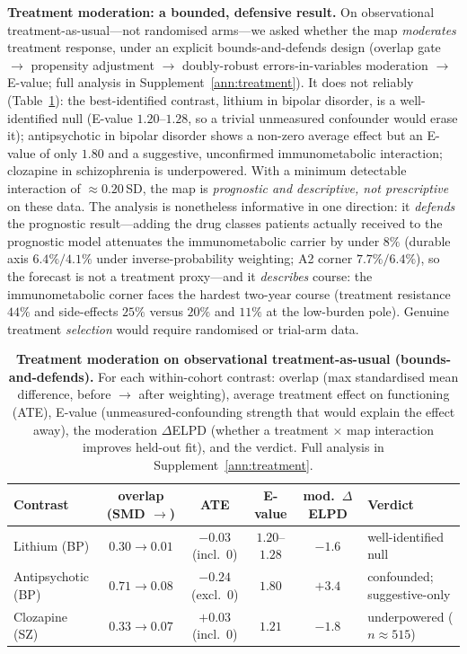 \medskip\noindent\textbf{Treatment moderation: a bounded, defensive result.}
On observational treatment-as-usual---not randomised arms---we asked whether the map
\emph{moderates} treatment response, under an explicit bounds-and-defends design (overlap gate
$\to$ propensity adjustment $\to$ doubly-robust errors-in-variables moderation $\to$ E-value; full
analysis in Supplement~\ref{ann:treatment}). It does not reliably (Table~\ref{tab:moderation}):
the best-identified contrast, lithium in bipolar disorder, is a well-identified null (E-value
$1.20$--$1.28$, so a trivial unmeasured confounder would erase it); antipsychotic in bipolar
disorder shows a non-zero average effect but an E-value of only $1.80$ and a suggestive,
unconfirmed immunometabolic interaction; clozapine in schizophrenia is underpowered. With a
minimum detectable interaction of $\approx0.20$\,SD, the map is \emph{prognostic and descriptive,
not prescriptive} on these data. The analysis is nonetheless informative in one direction: it
\emph{defends} the prognostic result---adding the drug classes patients actually received to the
prognostic model attenuates the immunometabolic carrier by under $8\%$ (durable axis
$6.4\%/4.1\%$ under inverse-probability weighting; A2 corner $7.7\%/6.4\%$), so the forecast is
not a treatment proxy---and it \emph{describes} course: the immunometabolic corner faces the
hardest two-year course (treatment resistance $44\%$ and side-effects $25\%$ versus $20\%$ and
$11\%$ at the low-burden pole). Genuine treatment \emph{selection} would require randomised or
trial-arm data.

\begin{table}[t]
\centering
\caption{\textbf{Treatment moderation on observational treatment-as-usual (bounds-and-defends).}
For each within-cohort contrast: overlap (max standardised mean difference, before $\to$ after
weighting), average treatment effect on functioning (ATE), E-value (unmeasured-confounding
strength that would explain the effect away), the moderation $\Delta$ELPD (whether a
treatment $\times$ map interaction improves held-out fit), and the verdict. Full analysis in
Supplement~\ref{ann:treatment}.}
\label{tab:moderation}
\small
\renewcommand{\arraystretch}{1.15}
\begin{tabular}{@{}l c c c c >{\raggedright\arraybackslash}p{2.7cm}@{}}
\toprule
Contrast & overlap (SMD $\to$) & ATE & E-value & mod.\ $\Delta$ELPD & Verdict \\
\midrule
Lithium (BP)       & $0.30\!\to\!0.01$ & $-0.03$ (incl.\ 0) & $1.20$--$1.28$ & $-1.6$ & well-identified null \\
Antipsychotic (BP) & $0.71\!\to\!0.08$ & $-0.24$ (excl.\ 0) & $1.80$         & $+3.4$ & confounded; suggestive-only \\
Clozapine (SZ)     & $0.33\!\to\!0.07$ & $+0.03$ (incl.\ 0) & $1.21$         & $-1.8$ & underpowered ($n\!\approx\!515$) \\
\bottomrule
\end{tabular}
\end{table}

